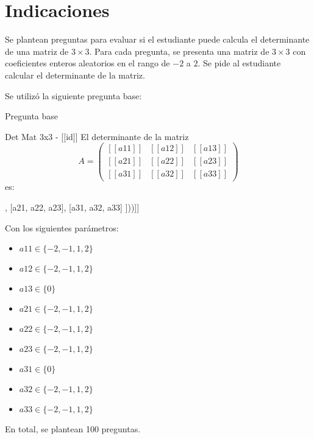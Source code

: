 \documentclass[a4,11pt]{aleph-notas}
\begin{document}
\encabezado

\vspace*{-8mm}
\section{Indicaciones}

Se plantean preguntas para evaluar si el estudiante puede calcula el determinante de una matriz de $3 \times 3$. Para cada pregunta, se presenta una matriz de $3 \times 3$ con coeficientes enteros aleatorios en el rango de $-2$ a $2$. Se pide al estudiante calcular el determinante de la matriz.


Se utilizó la siguiente pregunta base:
\begin{quiz}{Pregunta base}

\begin{numerical}[tolerance=0]%
    {Det Mat 3x3 - [[id]]}
    El determinante de la matriz
    \[
        A = \begin{pmatrix} [[a11]] & [[a12]] & [[a13]] \\ [[a21]] & [[a22]] & [[a23]] \\ [[a31]] & [[a32]] & [[a33]] \end{pmatrix}
    \]
    es:
    \item[] [[det(Matrix([ [a11, a12, a13], [a21, a22, a23], [a31, a32, a33] ]))]]
\end{numerical}

\end{quiz}
\noindent
Con los siguientes parámetros:
\begin{itemize}
	\item $a11 \in \{-2, -1, 1, 2\}$
	\item $a12 \in \{-2, -1, 1, 2\}$
	\item $a13 \in \{0\}$
	\item $a21 \in \{-2, -1, 1, 2\}$
	\item $a22 \in \{-2, -1, 1, 2\}$
	\item $a23 \in \{-2, -1, 1, 2\}$
	\item $a31 \in \{0\}$
	\item $a32 \in \{-2, -1, 1, 2\}$
	\item $a33 \in \{-2, -1, 1, 2\}$

\end{itemize}
En total, se plantean 100 preguntas.
\end{document}
